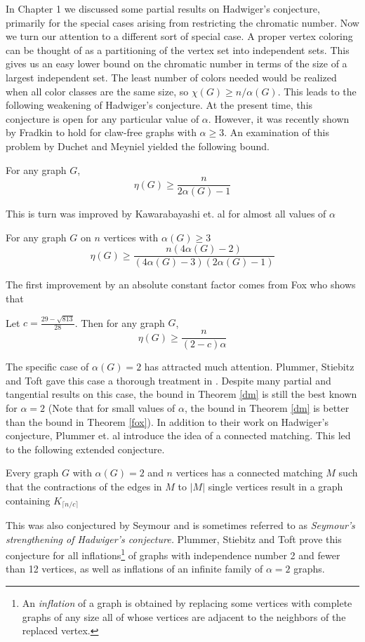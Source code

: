 	In Chapter 1 we discussed some partial results on Hadwiger's conjecture, primarily for the special cases arising from restricting the chromatic number.  Now we turn our attention to a different sort of special case.  A proper vertex coloring can be thought of as a partitioning of the vertex set into independent sets.  This gives us an easy lower bound on the chromatic number in terms of the size of a largest independent set.  The least number of colors needed would be realized when all color classes are the same size, so $\chi(G) \geq n/\alpha(G)$.  This leads to the following weakening of Hadwiger's conjecture.
At the present time, this conjecture is open for any particular value of $\alpha$.  However, it was recently shown by Fradkin \cite{fradkin} to hold for claw-free graphs with $\alpha \geq 3$. 
An examination of this problem by Duchet and Meyniel \cite{DandM} yielded the following bound.
\begin{theorem}
	For any graph $G$, 
\[\eta(G) \geq \frac{n}{2\alpha(G) -1}\]\label{dm}
\end{theorem}
This is turn was improved by Kawarabayashi et. al  \cite{Kawa} for almost all values of $\alpha$
\begin{theorem}
	For any graph $G$ on $n$ vertices with $\alpha(G) \geq 3$
\[\eta(G) \geq \frac{n(4\alpha(G)-2)}{(4\alpha(G)-3)(2\alpha(G)-1)}\]
\end{theorem}
The first improvement by an absolute constant factor comes from Fox \cite{fox} who shows that 
\begin{theorem}
	Let $c = \frac{29-\sqrt{813}}{28}$.  Then for any graph $G$,
\[\eta(G) \geq \frac{n}{(2-c)\alpha}\]\label{fox}
\end{theorem}
The specific case of $\alpha(G) = 2$ has attracted much attention.  Plummer, Stiebitz and Toft gave this case a thorough treatment in \cite{PST}.  Despite many partial and tangential results on this case, the bound in Theorem \ref{dm} is still the best known for $\alpha = 2$ (Note that for small values of $\alpha$, the bound in Theorem \ref{dm} is better than the bound in Theorem \ref{fox}).  In addition to their work on Hadwiger's conjecture, Plummer et. al introduce the  idea of a connected matching.  This led to the following extended conjecture.
\begin{conj} Every graph $G$ with $\alpha(G) = 2$ and $n$ vertices has a connected matching $M$ such that the contractions of the edges in $M$ to $|M|$ single vertices result in a graph containing $K_{\lceil n/c \rceil} $ 
\end{conj}
This was also conjectured by Seymour and is sometimes referred to as {\it Seymour's strengthening of Hadwiger's conjecture.}  Plummer, Stiebitz and Toft prove this conjecture for all inflations\footnote{An {\it inflation} of a graph is obtained by replacing some vertices with complete graphs of any size all of whose vertices are adjacent to the neighbors of the replaced vertex.} of graphs with independence number 2 and fewer than 12 vertices, as well as inflations of an infinite family of $\alpha = 2$ graphs.

